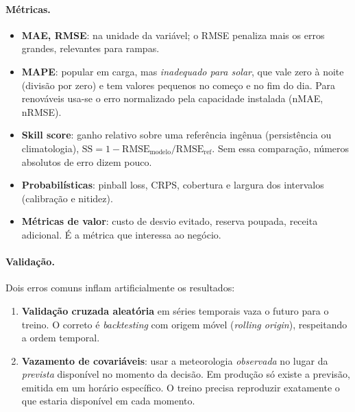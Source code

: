 \documentclass[10pt,a4paper,oneside]{article}
\begin{document}
\paragraph{Métricas.}
\begin{itemize}
  \item \textbf{MAE, RMSE}: na unidade da variável; o RMSE penaliza mais os
    erros grandes, relevantes para rampas.
  \item \textbf{MAPE}: popular em carga, mas \emph{inadequado para solar}, que
    vale zero à noite (divisão por zero) e tem valores pequenos no começo e
    no fim do dia. Para renováveis usa-se o erro normalizado pela capacidade
    instalada (nMAE, nRMSE).
  \item \textbf{Skill score}: ganho relativo sobre uma referência ingênua
    (persistência ou climatologia),
    $\mathrm{SS} = 1 - \mathrm{RMSE}_{\text{modelo}}/\mathrm{RMSE}_{\text{ref}}$.
    Sem essa comparação, números absolutos de erro dizem pouco.
  \item \textbf{Probabilísticas}: pinball loss, CRPS, cobertura e largura dos
    intervalos (calibração e nitidez).
  \item \textbf{Métricas de valor}: custo de desvio evitado, reserva poupada,
    receita adicional. É a métrica que interessa ao negócio.
\end{itemize}

\paragraph{Validação.} Dois erros comuns inflam artificialmente os resultados:
\begin{enumerate}
  \item \textbf{Validação cruzada aleatória} em séries temporais vaza o
    futuro para o treino. O correto é \textit{backtesting} com origem móvel
    (\textit{rolling origin}), respeitando a ordem temporal.
  \item \textbf{Vazamento de covariáveis}: usar a meteorologia
    \emph{observada} no lugar da \emph{prevista} disponível no momento da
    decisão. Em produção só existe a previsão, emitida em um horário
    específico. O treino precisa reproduzir exatamente o que estaria
    disponível em cada momento.
\end{enumerate}
\end{document}
